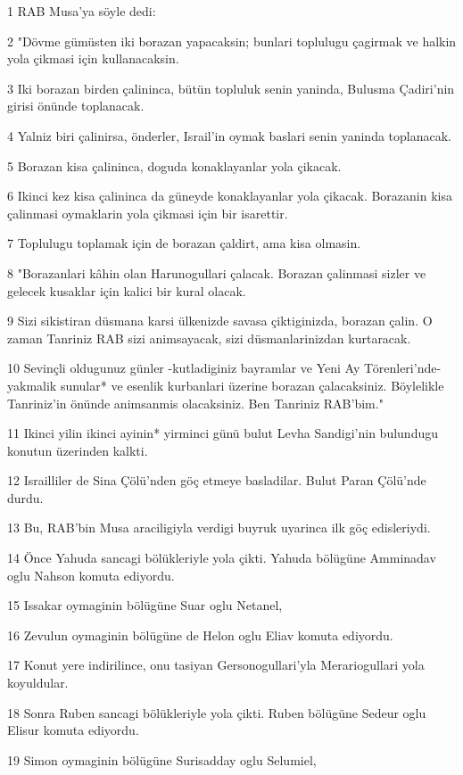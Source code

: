 \par 1 RAB Musa'ya söyle dedi:
\par 2 "Dövme gümüsten iki borazan yapacaksin; bunlari toplulugu çagirmak ve halkin yola çikmasi için kullanacaksin.
\par 3 Iki borazan birden çalininca, bütün topluluk senin yaninda, Bulusma Çadiri'nin girisi önünde toplanacak.
\par 4 Yalniz biri çalinirsa, önderler, Israil'in oymak baslari senin yaninda toplanacak.
\par 5 Borazan kisa çalininca, doguda konaklayanlar yola çikacak.
\par 6 Ikinci kez kisa çalininca da güneyde konaklayanlar yola çikacak. Borazanin kisa çalinmasi oymaklarin yola çikmasi için bir isarettir.
\par 7 Toplulugu toplamak için de borazan çaldirt, ama kisa olmasin.
\par 8 "Borazanlari kâhin olan Harunogullari çalacak. Borazan çalinmasi sizler ve gelecek kusaklar için kalici bir kural olacak.
\par 9 Sizi sikistiran düsmana karsi ülkenizde savasa çiktiginizda, borazan çalin. O zaman Tanriniz RAB sizi animsayacak, sizi düsmanlarinizdan kurtaracak.
\par 10 Sevinçli oldugunuz günler -kutladiginiz bayramlar ve Yeni Ay Törenleri'nde- yakmalik sunular* ve esenlik kurbanlari üzerine borazan çalacaksiniz. Böylelikle Tanriniz'in önünde animsanmis olacaksiniz. Ben Tanriniz RAB'bim."
\par 11 Ikinci yilin ikinci ayinin* yirminci günü bulut Levha Sandigi'nin bulundugu konutun üzerinden kalkti.
\par 12 Israilliler de Sina Çölü'nden göç etmeye basladilar. Bulut Paran Çölü'nde durdu.
\par 13 Bu, RAB'bin Musa araciligiyla verdigi buyruk uyarinca ilk göç edisleriydi.
\par 14 Önce Yahuda sancagi bölükleriyle yola çikti. Yahuda bölügüne Amminadav oglu Nahson komuta ediyordu.
\par 15 Issakar oymaginin bölügüne Suar oglu Netanel,
\par 16 Zevulun oymaginin bölügüne de Helon oglu Eliav komuta ediyordu.
\par 17 Konut yere indirilince, onu tasiyan Gersonogullari'yla Merariogullari yola koyuldular.
\par 18 Sonra Ruben sancagi bölükleriyle yola çikti. Ruben bölügüne Sedeur oglu Elisur komuta ediyordu.
\par 19 Simon oymaginin bölügüne Surisadday oglu Selumiel,
